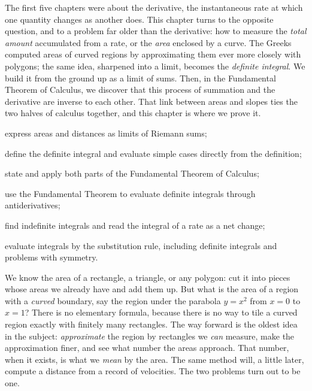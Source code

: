 \documentclass[a4paper,12pt,oneside]{memoir}
\begin{document}
\begin{lead}
The first five chapters were about the derivative, the instantaneous rate at which one quantity changes as another does. This chapter turns to the opposite question, and to a problem far older than the derivative: how to measure the \emph{total amount} accumulated from a rate, or the \emph{area} enclosed by a curve. The Greeks computed areas of curved regions by approximating them ever more closely with polygons; the same idea, sharpened into a limit, becomes the \emph{definite integral}. We build it from the ground up as a limit of sums. Then, in the Fundamental Theorem of Calculus, we discover that this process of summation and the derivative are inverse to each other. That link between areas and slopes ties the two halves of calculus together, and this chapter is where we prove it.
\end{lead}
\begin{objectives}
  \item express areas and distances as limits of Riemann sums;
  \item define the definite integral and evaluate simple cases directly from the definition;
  \item state and apply both parts of the Fundamental Theorem of Calculus;
  \item use the Fundamental Theorem to evaluate definite integrals through antiderivatives;
  \item find indefinite integrals and read the integral of a rate as a net change;
  \item evaluate integrals by the substitution rule, including definite integrals and problems with symmetry.
\end{objectives}
We know the area of a rectangle, a triangle, or any polygon: cut it into pieces whose areas we already have and add them up. But what is the area of a region with a \emph{curved} boundary, say the region under the parabola \(y = x^{2}\) from \(x = 0\) to \(x = 1\)? There is no elementary formula, because there is no way to tile a curved region exactly with finitely many rectangles. The way forward is the oldest idea in the subject: \emph{approximate} the region by rectangles we \emph{can} measure, make the approximation finer, and see what number the areas approach. That number, when it exists, is what we \emph{mean} by the area. The same method will, a little later, compute a distance from a record of velocities. The two problems turn out to be one.
\end{document}
